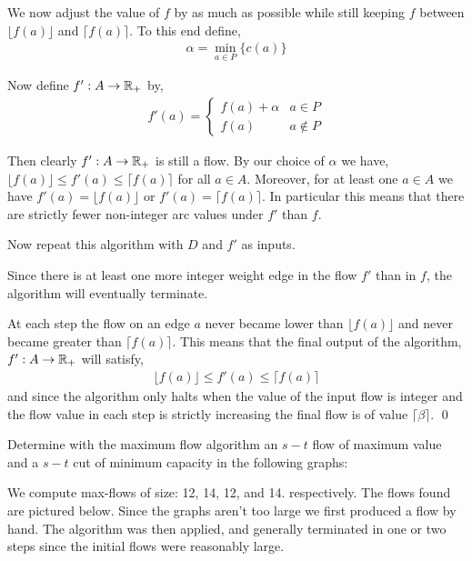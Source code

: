 \documentclass[10pt]{article}
\begin{document}
\begin{solution}
We now adjust the value of \( f \) by as much as possible while still keeping \( f \) between \( \lfloor f(a) \rfloor \) and \( \lceil f(a) \rceil \). To this end define,
\begin{align*}
    \alpha = \min_{a\in P} \{ c(a) \} 
\end{align*}

Now define \( f':A\to \mathbb{R}_+ \) by,
\begin{align*}
    f'(a) = \begin{cases}
        f(a) + \alpha & a\in P \\
        f(a) & a\notin P
    \end{cases}
\end{align*}

Then clearly \( f':A\to\mathbb{R}_+ \) is still a flow. By our choice of \( \alpha \) we have, \( \lfloor f(a) \rfloor \leq f'(a) \leq \lceil f(a) \rceil \) for all \( a\in A \). Moreover, for at least one \( a\in A \) we have \( f'(a) = \lfloor f(a) \rfloor \) or \( f'(a) = \lceil f(a) \rceil \). In particular this means that there are strictly fewer non-integer arc values under \( f'\) than \( f \).

Now repeat this algorithm with \( D \) and \( f' \) as inputs. 

Since there is at least one more integer weight edge in the flow \( f' \) than in \( f \), the algorithm will eventually terminate.

At each step the flow on an edge \( a \) never became lower than \( \lfloor f(a) \rfloor \) and never became greater than \( \lceil f(a) \rceil \). This means that the final output of the algorithm, \( f':A\to \mathbb{R}_+ \) will satisfy,
\begin{align*}
    \lfloor f(a) \rfloor \leq f'(a) \leq \lceil f(a) \rceil
\end{align*}
and since the algorithm only halts when the value of the input flow is integer and the flow value in each step is strictly increasing the final flow is of value \( \lceil \beta \rceil \). \qed


\end{solution}

\begin{problem}[Problem 4.7]
Determine with the maximum flow algorithm an \( s-t \) flow of maximum value and a \( s-t \) cut of minimum capacity in the following graphs:

\end{problem}

\begin{solution}
We compute max-flows of size: 12, 14, 12, and 14. respectively. The flows found are pictured below. Since the graphs aren't too large we first produced a flow by hand. The algorithm was then applied, and generally terminated in one or two steps since the initial flows were reasonably large.



\end{solution}
\end{document}
